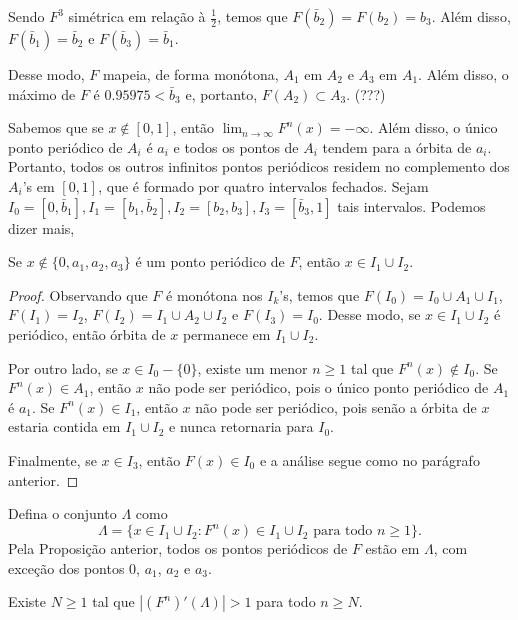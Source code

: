 Sendo $F^3$ simétrica em relação à $\frac{1}{2}$, temos que $F(\bar{b}_2) = F(b_2) = b_3$. Além disso, $F(\bar{b}_1) = \bar{b}_2$ e $F(\bar{b}_3) = \bar{b}_1$.

Desse modo, $F$ mapeia, de forma monótona, $A_1$ em $A_2$ e $A_3$ em $A_1$. Além disso, o máximo de $F$ é $0.95975 < \bar{b}_3$ e, portanto, $F(A_2) \subset A_3$. (???)

Sabemos que se $x \notin [0, 1]$, então $\lim_{n \to \infty} F^n(x) = -\infty$. Além disso, o único ponto periódico de $A_i$ é $a_i$ e todos os pontos de $A_i$ tendem para a órbita de $a_i$. Portanto, todos os outros infinitos pontos periódicos residem no complemento dos $A_i$'s em $[0, 1]$, que é formado por quatro intervalos fechados. Sejam $I_0 = [0, \bar{b}_1], I_1 = [b_1, \bar{b}_2], I_2 = [b_2, b_3], I_3 = [\bar{b}_3, 1]$ tais intervalos. Podemos dizer mais,

\begin{proposition}
Se $x \notin \{ 0, a_1, a_2, a_3 \}$ é um ponto periódico de $F$, então $x \in I_1 \cup I_2$.
\end{proposition}


\begin{proof}
Observando que $F$ é monótona nos $I_k$'s, temos que $F(I_0) = I_0 \cup A_1 \cup I_1$, $F(I_1) = I_2$, $F(I_2) = I_1 \cup A_2 \cup I_2$ e $F(I_3) = I_0$. Desse modo, se $x \in I_1 \cup I_2$ é periódico, então órbita de $x$ permanece em $I_1 \cup I_2$.

Por outro lado, se $x \in I_0 - \{ 0 \}$, existe um menor $n \geq 1$ tal que $F^n(x) \notin I_0$. Se $F^n(x) \in A_1$, então $x$ não pode ser periódico, pois o único ponto periódico de $A_1$ é $a_1$. Se $F^n(x) \in I_1$, então $x$ não pode ser periódico, pois senão a órbita de $x$ estaria contida em $I_1 \cup I_2$ e nunca retornaria para $I_0$.

Finalmente, se $x \in I_3$, então $F(x) \in I_0$ e a análise segue como no parágrafo anterior.
\end{proof}

Defina o conjunto $\Lambda$ como
$$\Lambda = \{ x \in I_1 \cup I_2 : F^n(x) \in I_1 \cup I_2 \textrm{ para todo } n \geq 1 \}.$$
Pela Proposição anterior, todos os pontos periódicos de $F$ estão em $\Lambda$, com exceção dos pontos $0$, $a_1$, $a_2$ e $a_3$.


\begin{lemma}
Existe $N \geq 1$ tal que $|(F^n)'(\Lambda)| > 1$ para todo $n \geq N$.
\end{lemma}


